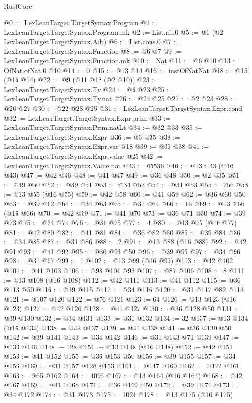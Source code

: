 \begin{lexlean}{RustCore}
\begin{coremodule}
@0 := LexLeanTarget.TargetSyntax.Program
@1 := LexLeanTarget.TargetSyntax.Program.mk
@2 := List.nil.{0}
@5 := @1 (@2 LexLeanTarget.TargetSyntax.Adt)
@6 := List.cons.{0}
@7 := LexLeanTarget.TargetSyntax.Function
@8 := @6 @7
@9 := LexLeanTarget.TargetSyntax.Function.mk
@10 := Nat
@11 := @6 @10
@13 := OfNat.ofNat.{0} @10
@14 := 0
@15 := @13 @14
@16 := instOfNatNat
@18 := @15 (@16 @14)
@22 := @9 (@11 @18 (@2 @10))
@23 := LexLeanTarget.TargetSyntax.Ty
@24 := @6 @23
@25 := LexLeanTarget.TargetSyntax.Ty.nat
@26 := @24 @25
@27 := @2 @23
@28 := @26 @27
@30 := @22 @28 @25
@31 := LexLeanTarget.TargetSyntax.Expr.cond
@32 := LexLeanTarget.TargetSyntax.Expr.prim
@33 := LexLeanTarget.TargetSyntax.Prim.natLt
@34 := @32 @33
@35 := LexLeanTarget.TargetSyntax.Expr
@36 := @6 @35
@38 := LexLeanTarget.TargetSyntax.Expr.var @18
@39 := @36 @38
@41 := LexLeanTarget.TargetSyntax.Expr.value @25
@42 := LexLeanTarget.TargetSyntax.Value.nat
@43 := 65536
@46 := @13 @43 (@16 @43)
@47 := @42 @46
@48 := @41 @47
@49 := @36 @48
@50 := @2 @35
@51 := @49 @50
@52 := @39 @51
@53 := @34 @52
@54 := @31 @53
@55 := 256
@58 := @13 @55 (@16 @55)
@59 := @42 @58
@60 := @41 @59
@62 := @36 @60 @50
@63 := @39 @62
@64 := @34 @63
@65 := @31 @64
@66 := 16
@69 := @13 @66 (@16 @66)
@70 := @42 @69
@71 := @41 @70
@73 := @36 @71 @50
@74 := @39 @73
@75 := @34 @74
@76 := @31 @75
@77 := 4
@80 := @13 @77 (@16 @77)
@81 := @42 @80
@82 := @41 @81
@84 := @36 @82 @50
@85 := @39 @84
@86 := @34 @85
@87 := @31 @86
@88 := 2
@91 := @13 @88 (@16 @88)
@92 := @42 @91
@93 := @41 @92
@95 := @36 @93 @50
@96 := @39 @95
@97 := @34 @96
@98 := @31 @97
@99 := 1
@102 := @13 @99 (@16 @99)
@103 := @42 @102
@104 := @41 @103
@106 := @98 @104 @93
@107 := @87 @106
@108 := 8
@111 := @13 @108 (@16 @108)
@112 := @42 @111
@113 := @41 @112
@115 := @36 @113 @50
@116 := @39 @115
@117 := @34 @116
@120 := @31 @117 @82 @113
@121 := @107 @120
@122 := @76 @121
@123 := 64
@126 := @13 @123 (@16 @123)
@127 := @42 @126
@128 := @41 @127
@130 := @36 @128 @50
@131 := @39 @130
@132 := @34 @131
@133 := @31 @132
@134 := 32
@137 := @13 @134 (@16 @134)
@138 := @42 @137
@139 := @41 @138
@141 := @36 @139 @50
@142 := @39 @141
@143 := @34 @142
@146 := @31 @143 @71 @139
@147 := @133 @146
@148 := 128
@151 := @13 @148 (@16 @148)
@152 := @42 @151
@153 := @41 @152
@155 := @36 @153 @50
@156 := @39 @155
@157 := @34 @156
@160 := @31 @157 @128 @153
@161 := @147 @160
@162 := @122 @161
@163 := @65 @162
@164 := 4096
@167 := @13 @164 (@16 @164)
@168 := @42 @167
@169 := @41 @168
@171 := @36 @169 @50
@172 := @39 @171
@173 := @34 @172
@174 := @31 @173
@175 := 1024
@178 := @13 @175 (@16 @175)

\end{coremodule}
\end{lexlean}
